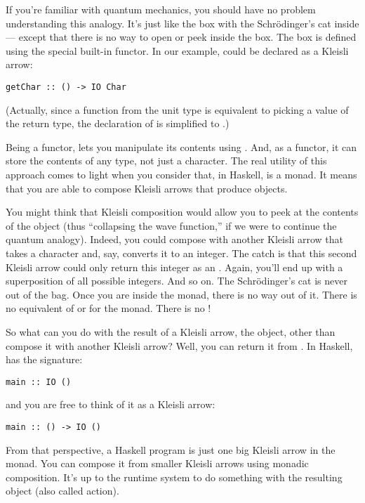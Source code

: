 If you're familiar with quantum mechanics, you should have no problem
understanding this analogy. It's just like the box with the
Schrödinger's cat inside --- except that there is no way to open or peek
inside the box. The box is defined using the special built-in
 functor. In our example,  could be declared
as a Kleisli arrow:

\begin{verbatim}
getChar :: () -> IO Char
\end{verbatim}
(Actually, since a function from the unit type is equivalent to picking
a value of the return type, the declaration of  is
simplified to .)

Being a functor,  lets you manipulate its contents using
. And, as a functor, it can store the contents of any type,
not just a character. The real utility of this approach comes to light
when you consider that, in Haskell,  is a monad. It means
that you are able to compose Kleisli arrows that produce 
objects.

You might think that Kleisli composition would allow you to peek at the
contents of the  object (thus ``collapsing the wave
function,'' if we were to continue the quantum analogy). Indeed, you
could compose  with another Kleisli arrow that takes a
character and, say, converts it to an integer. The catch is that this
second Kleisli arrow could only return this integer as an
. Again, you'll end up with a superposition of all
possible integers. And so on. The Schrödinger's cat is never out of the
bag. Once you are inside the  monad, there is no way out of
it. There is no equivalent of  or 
for the  monad. There is no !

So what can you do with the result of a Kleisli arrow, the 
object, other than compose it with another Kleisli arrow? Well, you can
return it from . In Haskell,  has the
signature:

\begin{verbatim}
main :: IO ()
\end{verbatim}
and you are free to think of it as a Kleisli arrow:

\begin{verbatim}
main :: () -> IO ()
\end{verbatim}
From that perspective, a Haskell program is just one big Kleisli arrow
in the  monad. You can compose it from smaller Kleisli arrows
using monadic composition. It's up to the runtime system to do something
with the resulting  object (also called  action).

